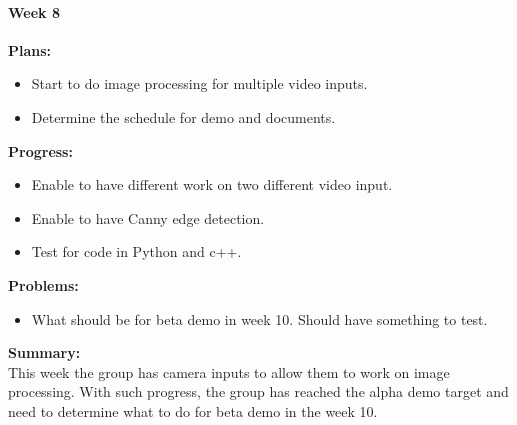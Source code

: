 \paragraph{Week 8}
\begin{adjustwidth}{2.5em}{0pt}
    \vspace{-0.5cm}\textbf{Plans:}
    \vspace{-0.5cm}
    \begin{itemize}
        \item Start to do image processing for multiple video inputs. 
        \item Determine the schedule for demo and documents.
    \end{itemize} 
    \vspace{-0.3cm}\textbf{Progress:}
    \vspace{-0.5cm}
    \begin{itemize}
        \item Enable to have different work on two different video input. 
        \item Enable to have Canny edge detection. 
        \item Test for code in Python and c++.
    \end{itemize} 
    \vspace{-0.3cm}\textbf{Problems:}
    \vspace{-0.5cm}
    \begin{itemize}
        \item What should be for beta demo in week 10. Should have something to test.
    \end{itemize}  
    \vspace{-0.3cm}\noindent\textbf{Summary:}\\
    \noindent This week the group has camera inputs to allow them to work on image processing. With such 
    progress, the group has reached the alpha demo target and need to determine what to do for beta demo 
    in the week 10. \\
\end{adjustwidth} 

